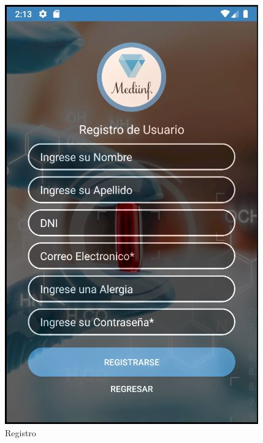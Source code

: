 \begin{figure}[H]
	\begin{minipage}[b]{0.55\linewidth}
		\centering
		\includegraphics[width=\linewidth]{img/movil2}
		\caption{Registro}
		\label{fig:figura3}
	\end{minipage}
	\hspace{0.5cm}
	\begin{minipage}[b]{0.55\linewidth}
		\centering

\end{minipage}
\end{figure}
